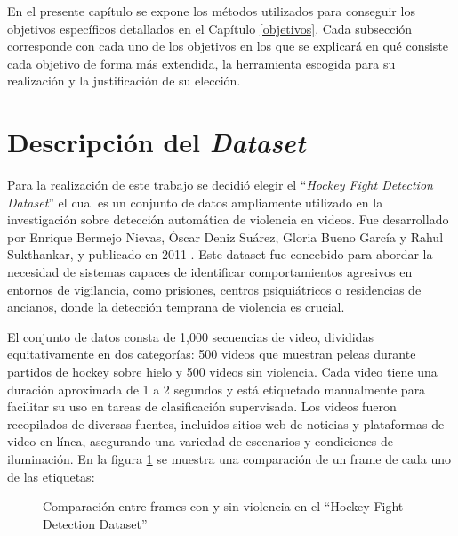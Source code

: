 En el presente capítulo se expone los métodos utilizados para 
conseguir los objetivos específicos detallados en el Capítulo 
\ref{objetivos}. Cada subsección corresponde con cada uno de 
los objetivos en los que se explicará en qué consiste cada 
objetivo de forma más extendida, la herramienta escogida 
para su realización y la justificación de su elección.

\section{Descripción del \textit{Dataset}}

Para la realización de este trabajo se decidió elegir el 
``\textit{Hockey Fight Detection Dataset}'' el cual es un 
conjunto de datos ampliamente utilizado en la investigación 
sobre detección automática de violencia en videos. Fue 
desarrollado por Enrique Bermejo Nievas, Óscar Deniz Suárez, 
Gloria Bueno García y Rahul Sukthankar, y publicado en 2011 
\cite{nievas2011violence}. 
Este dataset fue concebido para abordar la necesidad de 
sistemas capaces de identificar comportamientos agresivos en 
entornos de vigilancia, como prisiones, centros psiquiátricos 
o residencias de ancianos, donde la detección temprana de 
violencia es crucial.

El conjunto de datos consta de 1,000 secuencias de video, 
divididas equitativamente en dos categorías: 500 videos 
que muestran peleas durante partidos de hockey sobre hielo 
y 500 videos sin violencia. Cada video tiene una duración 
aproximada de 1 a 2 segundos y está etiquetado manualmente 
para facilitar su uso en tareas de clasificación supervisada. 
Los videos fueron recopilados de diversas fuentes, incluidos 
sitios web de noticias y plataformas de video en línea, 
asegurando una variedad de escenarios y condiciones de 
iluminación. En la figura \ref{fig:combinedHockey} se muestra 
una comparación de un frame de cada uno de las etiquetas: 

\begin{figure}[h!]%
    \centering
    \qquad
    \caption{Comparación entre frames con y sin violencia en el ``Hockey Fight Detection Dataset'' }%
    \label{fig:combinedHockey}%
\end{figure}


